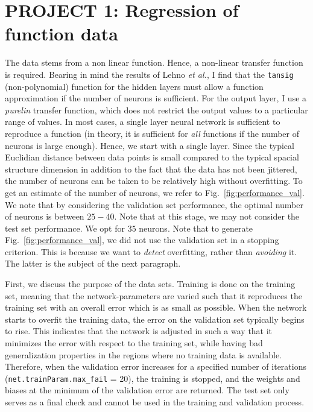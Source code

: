 \documentclass[pdftex,12pt,a4paper]{article}
\begin{document}
\section{PROJECT 1: Regression of function data}\label{sec:regression}
The data stems from a non linear function. Hence, a non-linear transfer function is required. Bearing in mind the results of Lehno \textit{et al.}, I find that the \texttt{tansig} (non-polynomial) function for the hidden layers must allow a function approximation if the number of neurons is sufficient. For the output layer, I use a \textit{purelin} transfer function, which does not restrict the output values to a particular range of values. In most cases, a single layer neural network is sufficient to reproduce a function (in theory, it is sufficient for \textit{all} functions if the number of neurons is large enough). Hence, we start with a single layer. Since the typical Euclidian distance between data points is small compared to the typical spacial structure dimension in addition to the fact that the data has not been jittered, the number of neurons can be taken to be relatively high without overfitting. To get an estimate of the number of neurons, we refer to Fig.~\ref{fig:performance_val}. We note that by considering the validation set performance, the optimal number of neurons is between $25 - 40$. Note that at this stage, we may not consider the test set performance. We opt for $35$ neurons. Note that to generate Fig.~\ref{fig:performance_val}, we did not use the validation set in a stopping criterion. This is because we want to \textit{detect} overfitting, rather than \textit{avoiding} it. The latter is the subject of the next paragraph.

First, we discuss the purpose of the data sets. Training is done on the training set, meaning that the network-parameters are varied such that it reproduces the training set with an overall error which is as small as possible. When the network starts to overfit the training data, the error on the validation set typically begins to rise. This indicates that the network is adjusted in such a way that it minimizes the error with respect to the training set, while having bad generalization properties in the regions where no training data is available. Therefore, when the validation error increases for a specified number of iterations (\texttt{net.trainParam.max\_fail} = 20), the training is stopped, and the weights and biases at the minimum of the validation error are returned. The test set only serves as a final check and cannot be used in the training and validation process.
\end{document}
